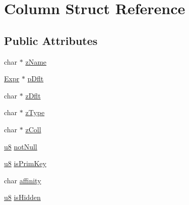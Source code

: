 \hypertarget{struct_column}{\section{Column Struct Reference}
\label{struct_column}
}
\subsection*{Public Attributes}
\begin{DoxyCompactItemize}
\item 
char $\ast$ \hyperlink{struct_column_a6450a4e9fde68b3a2d79425d826eccc3}{z\-Name}
\item 
\hyperlink{struct_expr}{Expr} $\ast$ \hyperlink{struct_column_ac4178f302df70048235660979f84ffe4}{p\-Dflt}
\item 
char $\ast$ \hyperlink{struct_column_a88d29c685783cddfbd039e5674990f4b}{z\-Dflt}
\item 
char $\ast$ \hyperlink{struct_column_aef09f43479c4bd2d07f77d340020f95f}{z\-Type}
\item 
char $\ast$ \hyperlink{struct_column_aa95909d5c77b321258622ed28d7b96eb}{z\-Coll}
\item 
\hyperlink{sqlite3_8c_a74a0f6424ae628af25f23f0a35f6ead3}{u8} \hyperlink{struct_column_a852e9a4c1c327a64d9b051dcafda3841}{not\-Null}
\item 
\hyperlink{sqlite3_8c_a74a0f6424ae628af25f23f0a35f6ead3}{u8} \hyperlink{struct_column_a57a53c2c60925a1ce5fdfe8fa3ccd62a}{is\-Prim\-Key}
\item 
char \hyperlink{struct_column_ac9d6fe31c45888cecaf3f5ad5b93bf23}{affinity}
\item 
\hyperlink{sqlite3_8c_a74a0f6424ae628af25f23f0a35f6ead3}{u8} \hyperlink{struct_column_aafdb39efd9b21476415c5beeb5a8b180}{is\-Hidden}
\end{DoxyCompactItemize}


